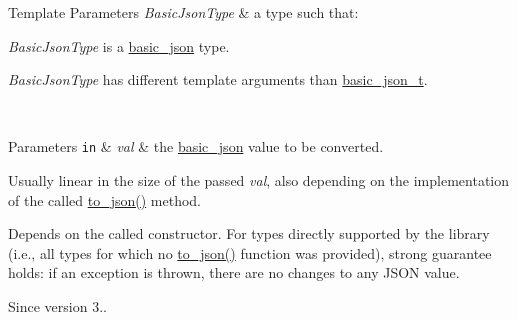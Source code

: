\begin{DoxyTemplParams}{Template Parameters}
{\em Basic\+Json\+Type} & a type such that\+:
\begin{DoxyItemize}
\item {\itshape Basic\+Json\+Type} is a \hyperlink{classnlohmann_1_1basic__json}{basic\+\_\+json} type.
\item {\itshape Basic\+Json\+Type} has different template arguments than \hyperlink{classnlohmann_1_1basic__json_afff7860310ae69f29f8158a77ec0ef13}{basic\+\_\+json\+\_\+t}.
\end{DoxyItemize}\\
\hline
\end{DoxyTemplParams}

\begin{DoxyParams}[1]{Parameters}
\mbox{\tt in}  & {\em val} & the \hyperlink{classnlohmann_1_1basic__json}{basic\+\_\+json} value to be converted.\\
\hline
\end{DoxyParams}
Usually linear in the size of the passed {\itshape val}, also depending on the implementation of the called {\ttfamily \hyperlink{namespacenlohmann_1_1anonymous__namespace_02to__json_8hpp_03_a3cf8d817622a3ecdd3dcce222deb7535}{to\+\_\+json()}} method.

Depends on the called constructor. For types directly supported by the library (i.\+e., all types for which no {\ttfamily \hyperlink{namespacenlohmann_1_1anonymous__namespace_02to__json_8hpp_03_a3cf8d817622a3ecdd3dcce222deb7535}{to\+\_\+json()}} function was provided), strong guarantee holds\+: if an exception is thrown, there are no changes to any J\+S\+ON value.

\begin{DoxySince}{Since}
version 3.. 
\end{DoxySince}
